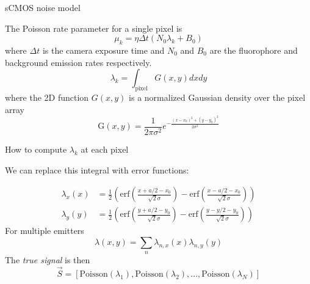 \documentclass[aspectratio=169]{beamer}
\begin{document}
\begin{frame}{sCMOS noise model}

The Poisson rate parameter for a single pixel is 
\begin{equation*}
\mu_{k} = \eta\Delta t(N_{0}\lambda_{k} + B_{0}) 
\end{equation*}
where $\Delta t$ is the camera exposure time and $N_{0}$ and $B_{0}$ are the fluorophore and background emission rates respectively. 
\begin{equation*}
\lambda_{k} = \int_{\mathrm{pixel}}G(x,y)dxdy
\end{equation*}
where the 2D function $G(x,y)$ is a normalized Gaussian density over the pixel array
\begin{equation*}
\mathrm{G}(x,y) = \frac{1}{2\pi\sigma^{2}}e^{-\frac{(x-x_{0})^{2}+(y-y_{0})^{2}}{2\sigma^{2}}}
\end{equation*}
\end{frame}

\begin{frame}{How to compute $\lambda_{k}$ at each pixel}

We can replace this integral with error functions:

\begin{align*}
\lambda_{x}(x) &= \frac{1}{2}\left(\mathrm{erf}\left(\frac{x+a/2-x_{0}}{\sqrt{2}\sigma}\right) -\mathrm{erf}\left(\frac{x-a/2-x_{0}}{\sqrt{2}\sigma}\right)\right)\\
\lambda_{y}(y) &= \frac{1}{2}\left(\mathrm{erf}\left(\frac{y+a/2-y_{0}}{\sqrt{2}\sigma}\right) -\mathrm{erf}\left(\frac{y-y/2-y_{0}}{\sqrt{2}\sigma}\right)\right)
\end{align*}
For multiple emitters
\begin{equation*}
\lambda(x,y) = \sum_{n}\lambda_{n,x}(x)\lambda_{n,y}(y)
\end{equation*}
The \emph{true signal} is then
\begin{equation*}
\vec{S} = \left[\mathrm{Poisson}(\lambda_{1}), \mathrm{Poisson}(\lambda_{2}), ..., \mathrm{Poisson}(\lambda_{N})\right]
\end{equation*}

\end{frame}
\end{document}
